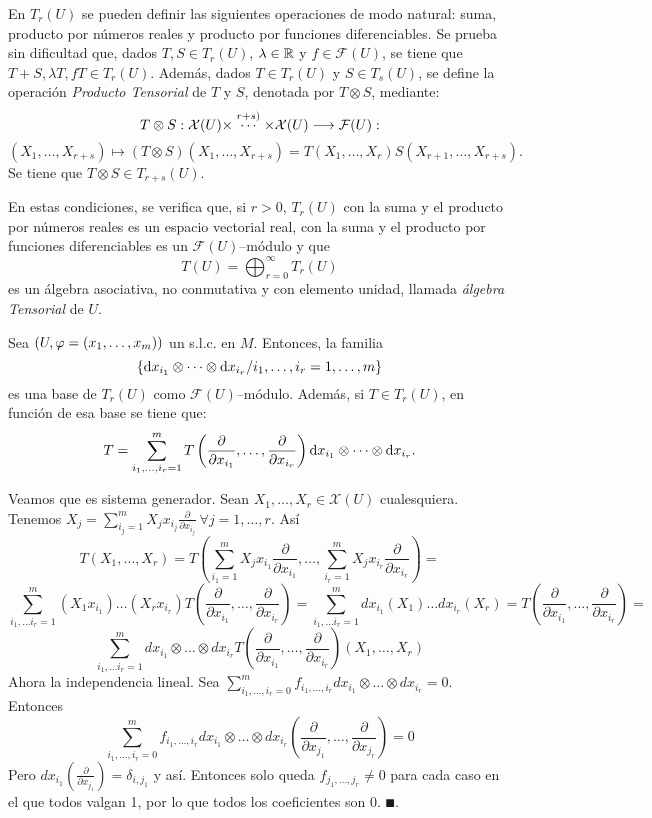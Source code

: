 \documentclass[cursovd_portada.tex]{subfiles}
\begin{document}
En $T_r(U)$ se pueden definir las siguientes operaciones de modo natural: suma, producto por números reales y
producto por funciones diferenciables. Se prueba sin dificultad que, dados $T,S\in T_r(U)$, $\lambda\in\mathbb{R}$ y
$f\in\mathcal{F}(U)$, se tiene que $T+S,\lambda T,fT\in T_r(U)$. Además, dados $T\in T_r(U)$ y $S\in T_s(U)$, se
define la operación {\it Producto Tensorial} de $T$ y $S$, denotada por $T\otimes S$, mediante:
$$T\otimes S:{\cal X}(U)\times\stackrel{r+s)}\cdots\times\mathcal{X}(U)\longrightarrow\mathcal{F}(U):$$
$$(X_1,\dots ,X_{r+s})\mapsto(T\otimes S)(X_1,\dots ,X_{r+s})=T(X_1,\dots ,X_r)S(X_{r+1},\dots ,X_{r+s}).$$
\hs Se tiene que $T\otimes S\in T_{r+s}(U)$.
\par
En estas condiciones, se verifica que, si $r>0$, $T_r(U)$ con la suma y el producto por números reales es un
espacio vectorial real, con la suma y el producto por funciones diferenciables es un $\mathcal{F}(U)$--módulo y
que
$$T(U)=\bigoplus_{r=0}^{\infty}T_r(U)$$
es un álgebra asociativa, no conmutativa y con elemento unidad, llamada {\it álgebra Tensorial} de $U$.
\begin{prop}
Sea $(U,\varphi=(x_1,\dots ,x_m))$ un s.l.c. en $M$. Entonces, la familia
$$\{{\rm d} x_{i_1}\otimes\cdots\otimes{\rm d} x_{i_r}/i_1,\dots ,i_r=1,\dots ,m\}$$
es una base de $T_r(U)$ como $\mathcal{F}(U)$--módulo. Además, si $T\in T_r(U)$, en función de esa base se tiene
que:
$$T=\sum_{i_1,\dots ,i_r=1}^mT\left(\displaystyle{\frac{\partial}{\partial x_{i_1}}},\dots
,\displaystyle{\frac{\partial}{\partial x_{i_r}}}\right){\rm d} x_{i_1}\otimes\cdots\otimes{\rm d} x_{i_r}.$$
\end{prop}
\begin{dem}
Veamos que es sistema generador. Sean $X_1,\dots, X_r\in\mathcal{X}(U)$ cualesquiera. Tenemos $X_j=\sum_{i_j=1}^mX_jx_{i_j}\frac{\partial}{\partial x_{i_j}}\ \forall j=1,\dots,r$. Así
$$T(X_1,\dots,X_r)=T(\sum_{i_1=1}^mX_jx_{i_1}\frac{\partial}{\partial x_{i_1}},\dots,\sum_{i_r=1}^mX_jx_{i_r}\frac{\partial}{\partial x_{i_r}})=$$
$$\sum_{i_1,\dots i_r=1}^m(X_1x_{i_1})\dots(X_rx_{i_r})T(\frac{\partial}{\partial x_{i_1}},\dots,\frac{\partial}{\partial x_{i_r}})=\sum_{i_1,\dots i_r=1}^mdx_{i_1}(X_1)\dots dx_{i_r}(X_r)=T(\frac{\partial}{\partial x_{i_1}},\dots,\frac{\partial}{\partial x_{i_r}})=$$
$$\sum_{i_1,\dots i_r=1}^mdx_{i_1}\otimes\dots\otimes dx_{i_r}T(\frac{\partial}{\partial x_{i_1}},\dots,\frac{\partial}{\partial x_{i_r}})(X_1,\dots,X_r)$$
Ahora la independencia lineal. Sea $\sum_{i_1,\dots,i_r=0}^m f_{i_1,\dots, i_r}dx_{i_1}\otimes\dots\otimes dx_{i_r}=0$. Entonces 
$$\sum_{i_1,\dots,i_r=0}^m f_{i_1,\dots, i_r}dx_{i_1}\otimes\dots\otimes dx_{i_r}(\frac{\partial}{\partial x_{j_1}},\dots,\frac{\partial}{\partial x_{j_r}})=0$$
Pero $dx_{i_1}(\frac{\partial }{\partial x_{j_1}})=\delta_{i,j_1}$ y así. Entonces solo queda $f_{j_1,\dots,j_r}\neq 0$ para cada caso en el que todos valgan 1, por lo que todos los coeficientes son 0. $\QED$. 
\end{dem}
\end{document}
